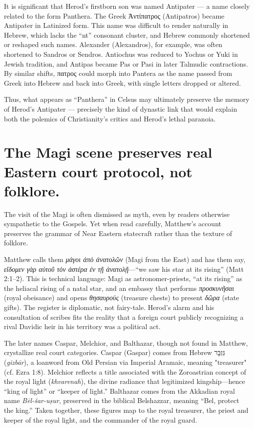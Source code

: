 It is significant that Herod's firstborn son was named Antipater --- a name closely related to the form Panthera.
The Greek Ἀντίπατρος (Antipatros) became Antipater in Latinized form.
This name was difficult to render naturally in Hebrew, which lacks the “nt” consonant cluster, and Hebrew commonly shortened or reshaped such names.
Alexander (Alexandros), for example, was often shortened to Sandros or Sendros.
Antiochus was reduced to Yochus or Yuki in Jewish tradition, and Antipas became Pas or Pasi in later Talmudic contractions.
By similar shifts, πατρος could morph into Pantera as the name passed from Greek into Hebrew and back into Greek, with single letters dropped or altered.

Thus, what appears as “Panthera” in Celsus may ultimately preserve the memory of Herod’s Antipater --- precisely the kind of dynastic link that would explain both the polemics of Christianity’s critics and Herod’s lethal paranoia.

\section{The Magi scene preserves real Eastern court protocol, not folklore.}\label{sec:magi-court-protocol}

The visit of the Magi is often dismissed as myth, even by readers otherwise sympathetic to the Gospels.
Yet when read carefully, Matthew’s account preserves the grammar of Near Eastern statecraft rather than the texture of folklore.

Matthew calls them \textit{μάγοι ἀπὸ ἀνατολῶν} (Magi from the East) and has them say, \textit{εἴδομεν γὰρ αὐτοῦ τὸν ἀστέρα ἐν τῇ ἀνατολῇ}---“we saw his star at its rising” (Matt 2:1--2).
This is technical language: Magi as astronomer-priests, “at its rising” as the heliacal rising of a natal star, and an embassy that performs \textit{προσκυνῆσαι} (royal obeisance) and opens \textit{θησαυρούς} (treasure chests) to present \textit{δῶρα} (state gifts).
The register is diplomatic, not fairy-tale.
Herod’s alarm and his consultation of scribes fits the reality that a foreign court publicly recognizing a rival Davidic heir in his territory was a political act.

The later names Caspar, Melchior, and Balthazar, though not found in Matthew, crystallize real court categories.
Caspar (Gaspar) comes from Hebrew \texthebrew{גִּזְבָּר} (\textit{gizbār}), a loanword from Old Persian via Imperial Aramaic, meaning "treasurer" (cf. Ezra 1:8).
Melchior reflects a title associated with the Zoroastrian concept of the royal light (\emph{khvarenah}), the divine radiance that legitimized kingship---hence “king of light” or “keeper of light.”
Balthazar comes from the Akkadian royal name \textit{Bēl-šar-uṣur}, preserved in the biblical Belshazzar, meaning “Bel, protect the king.”
Taken together, these figures map to the royal treasurer, the priest and keeper of the royal light, and the commander of the royal guard.

